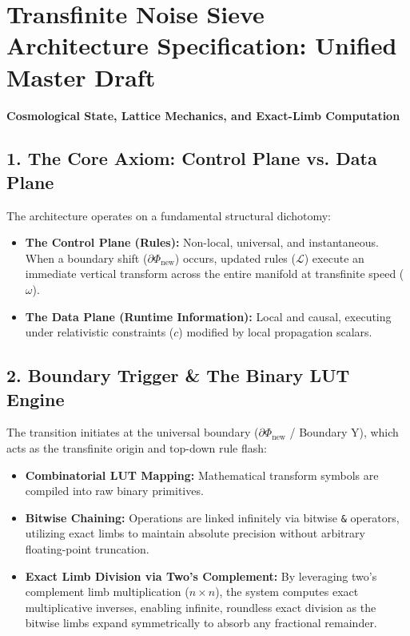 \chapter{\texorpdfstring{Transfinite Noise Sieve Architecture Specification: Unified Master Draft}{Transfinite Noise Sieve Architecture Specification: Unified Master Draft}}
\label{chap:noise-sieve-4-laplace-demon}

\textbf{Cosmological State, Lattice Mechanics, and Exact-Limb Computation}

\medskip

\section{\texorpdfstring{1. The Core Axiom: Control Plane vs. Data Plane}{1. The Core Axiom: Control Plane vs. Data Plane}}

The architecture operates on a fundamental structural dichotomy:

\begin{itemize}
\item \textbf{The Control Plane (Rules):} Non-local, universal, and instantaneous. When a boundary shift (\(\partial\Phi_{\text{new}}\)) occurs, updated rules (\(\mathcal{L}\)) execute an immediate vertical transform across the entire manifold at transfinite speed (\(\omega\)).
\item \textbf{The Data Plane (Runtime Information):} Local and causal, executing under relativistic constraints (\(c\)) modified by local propagation scalars.
\end{itemize}

\medskip

\section{\texorpdfstring{2. Boundary Trigger \& The Binary LUT Engine}{2. Boundary Trigger \& The Binary LUT Engine}}

The transition initiates at the universal boundary (\(\partial\Phi_{\text{new}}\) / Boundary Y), which acts as the transfinite origin and top-down rule flash:

\begin{itemize}
\item \textbf{Combinatorial LUT Mapping:} Mathematical transform symbols are compiled into raw binary primitives.
\item \textbf{Bitwise Chaining:} Operations are linked infinitely via bitwise \texttt{\&} operators, utilizing exact limbs to maintain absolute precision without arbitrary floating-point truncation.
\item \textbf{Exact Limb Division via Two's Complement:} By leveraging two's complement limb multiplication (\(n \times n\)), the system computes exact multiplicative inverses, enabling infinite, roundless exact division as the bitwise limbs expand symmetrically to absorb any fractional remainder.
\end{itemize}

